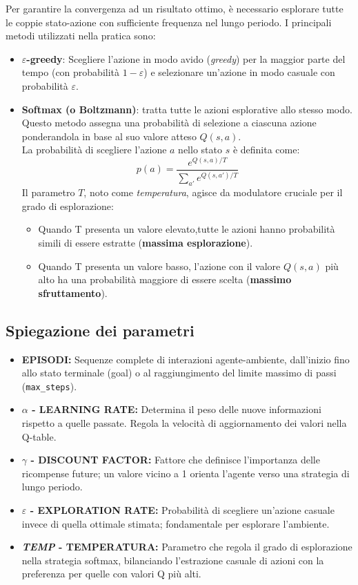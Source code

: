\documentclass[12pt,a4paper]{article}
\begin{document}
Per garantire la convergenza ad un risultato ottimo, è necessario esplorare tutte le coppie stato-azione con sufficiente frequenza nel lungo periodo. I principali metodi utilizzati nella pratica sono:

\begin{itemize}
  \item \textbf{\( \varepsilon \)-greedy}: 
    Scegliere l'azione in modo avido (\textit{greedy}) per la maggior parte del tempo (con probabilità \( 1 - \varepsilon \)) e selezionare un'azione in modo casuale con probabilità \( \varepsilon \).
  \item \textbf{Softmax (o Boltzmann)}: 
    tratta tutte le azioni esplorative allo stesso modo. Questo metodo assegna una probabilità di selezione a ciascuna azione ponderandola in base al suo valore atteso \( Q(s,a) \).\\
    La probabilità di scegliere l'azione \( a \) nello stato \( s \) è definita come:
    \[
      p(a) = \frac{e^{Q(s,a)/T}}{\sum_{a'} e^{Q(s,a')/T}}
    \]
    Il parametro \( T \), noto come \textit{temperatura}, agisce da modulatore cruciale per il grado di esplorazione:
    \begin{itemize}
      \item Quando T presenta un valore elevato,tutte le azioni hanno probabilità simili di essere estratte (\textbf{massima esplorazione}).
      \item Quando T presenta un valore basso, l'azione con il valore \( Q(s,a) \) più alto ha una probabilità maggiore di essere scelta (\textbf{massimo sfruttamento}).
    \end{itemize}
\end{itemize}

\subsection{Spiegazione dei parametri}
\begin{itemize}
    \item \textbf{EPISODI:} Sequenze complete di interazioni agente-ambiente, dall'inizio fino allo stato terminale (goal) o al raggiungimento del limite massimo di passi (\texttt{max\_steps}).
    \item \textbf{\(\alpha\) - LEARNING RATE:} Determina il peso delle nuove informazioni rispetto a quelle passate. Regola la velocità di aggiornamento dei valori nella Q-table.
    \item \textbf{\(\gamma\) - DISCOUNT FACTOR:} Fattore che definisce l'importanza delle ricompense future; un valore vicino a 1 orienta l'agente verso una strategia di lungo periodo.
    \item \textbf{\(\varepsilon\) - EXPLORATION RATE:} Probabilità di scegliere un'azione casuale invece di quella ottimale stimata; fondamentale per esplorare l'ambiente.
    \item \textbf{\textit{TEMP} - TEMPERATURA:} Parametro che regola il grado di esplorazione nella strategia softmax, bilanciando l'estrazione casuale di azioni con la preferenza per quelle con valori Q più alti.
\end{itemize}
\end{document}
